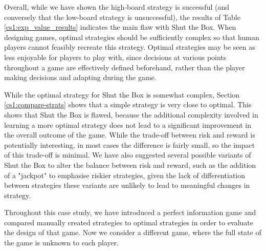 Overall, while we have shown the high-board strategy is successful (and conversely that the low-board strategy is unsuccessful), the results of Table \ref{cs1:exp_value_results} indicates the main flaw with Shut the Box. When designing games, optimal strategies should be sufficiently complex so that human players cannot feasibly recreate this strategy. Optimal strategies may be seen as less enjoyable for players to play with, since decisions at various points throughout a game are effectively defined beforehand, rather than the player making decisions and adapting during the game. 

While the optimal strategy for Shut the Box is somewhat complex, Section \ref{cs1:compare-strats} shows that a simple strategy is very close to optimal. This shows that Shut the Box is flawed, because the additional complexity involved in learning a more optimal strategy does not lead to a significant improvement in the overall outcome of the game. While the trade-off between risk and reward is potentially interesting, in most cases the difference is fairly small, so the impact of this trade-off is minimal. We have also suggested several possible variants of Shut the Box to alter the balance between risk and reward, such as the addition of a "jackpot" to emphasise riskier strategies, given the lack of differentiation between strategies these variants are unlikely to lead to meaningful changes in strategy.

Throughout this case study, we have introduced a perfect information game and compared manually created strategies to optimal strategies in order to evaluate the design of that game. Now we consider a different game, where the full state of the game is unknown to each player.